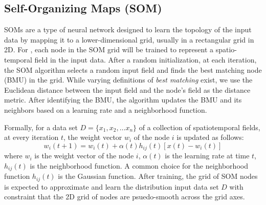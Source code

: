 

\subsection{Self-Organizing Maps (SOM)}
SOMs are a type of neural network designed to learn the topology of the input data by mapping it to a lower-dimensional grid, usually in a rectangular grid in 2D.
%
For \ClimateSOM, each node in the SOM grid will be trained to represent a spatio-temporal field in the input data.
%
After a random initialization, at each iteration, the SOM algorithm selects a random input field and finds the best matching node (BMU) in the grid. 
%
While varying definitions of \textit{best matching} exist, we use the Euclidean distance between the input field and the node's field as the distance metric.
%
After identifying the BMU, the algorithm updates the BMU and its neighbors based on a learning rate and a neighborhood function.

Formally, for a data set $D=\{x_1, x_2, \dots x_n\}$ of a collection of spatiotemporal fields, at every iteration $t$, the weight vector $w_i$ of the node $i$ is updated as follows:
\begin{equation}
    w_{i}(t+1) = w_{i}(t) + \alpha(t)h_{ij}(t)[x(t) - w_{i}(t)]
\end{equation}
where $w_{i}$ is the weight vector of the node $i$, $\alpha(t)$ is the learning rate at time $t$, $h_{ij}(t)$ is the neighborhood function.
%
A common choice for the neighborhood function $h_{ij}(t)$ is the Gaussian function.
%
After training, the grid of SOM nodes is expected to approximate and learn the distribution input data set $D$ with constraint that the 2D grid of nodes are psuedo-smooth across the grid axes.


